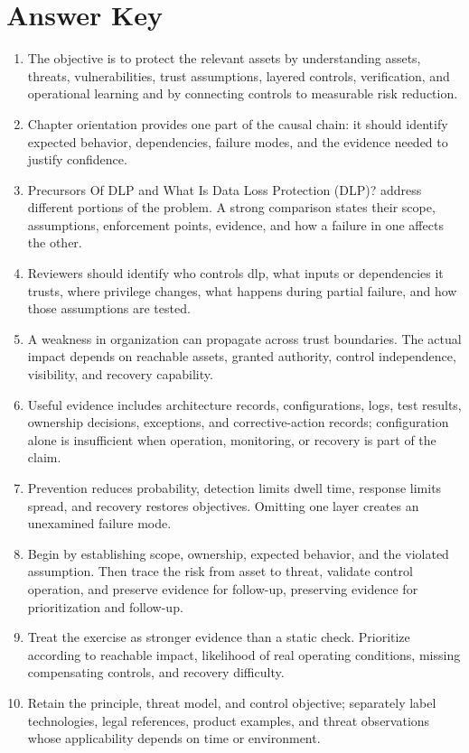 \documentclass[11pt]{article}
\begin{document}
\section*{Answer Key}
\begin{enumerate}
\item The objective is to protect the relevant assets by understanding assets, threats, vulnerabilities, trust assumptions, layered controls, verification, and operational learning and by connecting controls to measurable risk reduction.
\item Chapter orientation provides one part of the causal chain: it should identify expected behavior, dependencies, failure modes, and the evidence needed to justify confidence.
\item Precursors Of DLP and What Is Data Loss Protection (DLP)? address different portions of the problem. A strong comparison states their scope, assumptions, enforcement points, evidence, and how a failure in one affects the other.
\item Reviewers should identify who controls dlp, what inputs or dependencies it trusts, where privilege changes, what happens during partial failure, and how those assumptions are tested.
\item A weakness in organization can propagate across trust boundaries. The actual impact depends on reachable assets, granted authority, control independence, visibility, and recovery capability.
\item Useful evidence includes architecture records, configurations, logs, test results, ownership decisions, exceptions, and corrective-action records; configuration alone is insufficient when operation, monitoring, or recovery is part of the claim.
\item Prevention reduces probability, detection limits dwell time, response limits spread, and recovery restores objectives. Omitting one layer creates an unexamined failure mode.
\item Begin by establishing scope, ownership, expected behavior, and the violated assumption. Then trace the risk from asset to threat, validate control operation, and preserve evidence for follow-up, preserving evidence for prioritization and follow-up.
\item Treat the exercise as stronger evidence than a static check. Prioritize according to reachable impact, likelihood of real operating conditions, missing compensating controls, and recovery difficulty.
\item Retain the principle, threat model, and control objective; separately label technologies, legal references, product examples, and threat observations whose applicability depends on time or environment.
\end{enumerate}
\end{document}
